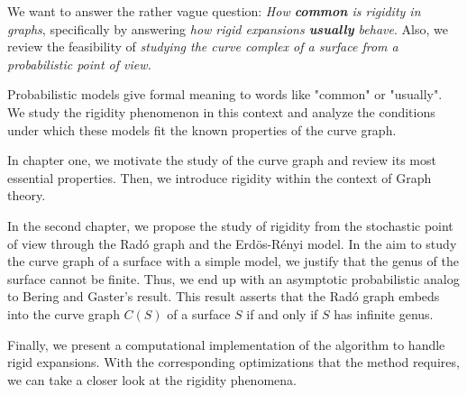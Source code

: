 We want to answer the rather vague question: \textit{How \textbf{common} is rigidity in graphs}, specifically by answering \textit{how rigid expansions \textbf{usually} behave}. Also, we review the feasibility of \textit{studying the curve complex of a surface from a probabilistic point of view.}

Probabilistic models give formal meaning to words like "common" or "usually". We study the rigidity phenomenon in this context and analyze the conditions under which these models fit the known properties of the curve graph.

In chapter one, we motivate the study of the curve graph and review its most essential properties. Then, we introduce rigidity within the context of Graph theory.

In the second chapter, we propose the study of rigidity from the stochastic point of view through the Radó graph and the Erdös-Rényi model. In the aim to study the curve graph of a surface with a simple model, we justify that the genus of the surface cannot be finite. Thus, we end up with an asymptotic probabilistic analog to Bering and Gaster's result. This result asserts that the Radó graph embeds into the curve graph $C(S)$ of a surface $S$ if and only if $S$ has infinite genus.

Finally, we present a computational implementation of the algorithm to handle rigid expansions. With the corresponding optimizations that the method requires, we can take a closer look at the rigidity phenomena.